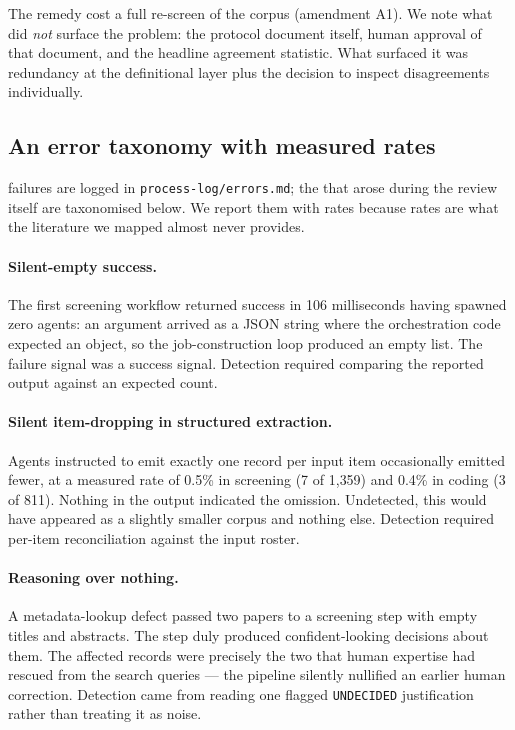 The remedy cost a full re-screen of the corpus (amendment A1). We note what did \emph{not}
surface the problem: the protocol document itself, human approval of that document, and the
headline agreement statistic. What surfaced it was redundancy at the definitional layer plus
the decision to inspect disagreements individually.

\subsection{An error taxonomy with measured rates}

\nErrLogged{} failures are logged in \texttt{process-log/errors.md}; the \nErrReview{} that
arose during the review itself are taxonomised below. We report them with rates because rates
are what the literature we mapped almost never provides.

\paragraph{Silent-empty success.} The first screening workflow returned success in 106
milliseconds having spawned zero agents: an argument arrived as a JSON string where the
orchestration code expected an object, so the job-construction loop produced an empty list.
The failure signal was a success signal. Detection required comparing the reported output
against an expected count.

\paragraph{Silent item-dropping in structured extraction.} Agents instructed to emit exactly
one record per input item occasionally emitted fewer, at a measured rate of 0.5\% in screening
(7 of 1{,}359) and 0.4\% in coding (3 of 811). Nothing in the output indicated the omission.
Undetected, this would have appeared as a slightly smaller corpus and nothing else. Detection
required per-item reconciliation against the input roster.

\paragraph{Reasoning over nothing.} A metadata-lookup defect passed two papers to a screening
step with empty titles and abstracts. The step duly produced confident-looking decisions about
them. The affected records were precisely the two that human expertise had rescued from the
search queries --- the pipeline silently nullified an earlier human correction. Detection came
from reading one flagged \texttt{UNDECIDED} justification rather than treating it as noise.

